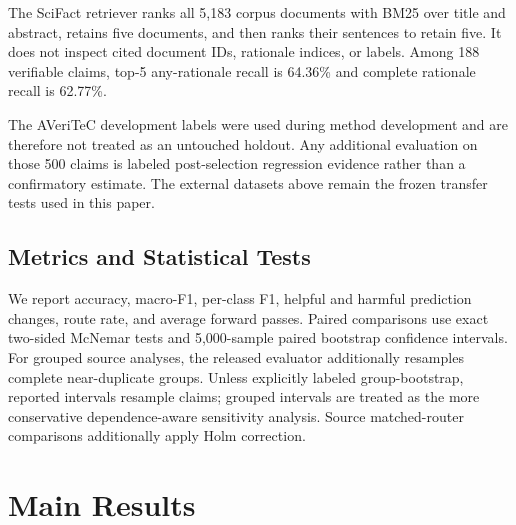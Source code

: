 \documentclass[runningheads]{llncs}
\begin{document}
The SciFact retriever ranks all 5,183 corpus documents with BM25 over title and
abstract, retains five documents, and then ranks their sentences to retain
five. It does not inspect cited document IDs, rationale indices, or labels.
Among 188 verifiable claims, top-5 any-rationale recall is 64.36\% and complete
rationale recall is 62.77\%.

The AVeriTeC development labels were used during method development and are
therefore not treated as an untouched holdout. Any additional evaluation on
those 500 claims is labeled post-selection regression evidence rather than a
confirmatory estimate. The external datasets above remain the frozen transfer
tests used in this paper.

\subsection{Metrics and Statistical Tests}

We report accuracy, macro-F1, per-class F1, helpful and harmful prediction
changes, route rate, and average forward passes. Paired comparisons use exact
two-sided McNemar tests and 5,000-sample paired bootstrap confidence intervals.
For grouped source analyses, the released evaluator additionally resamples
complete near-duplicate groups. Unless explicitly labeled group-bootstrap,
reported intervals resample claims; grouped intervals are treated as the more
conservative dependence-aware sensitivity analysis. Source matched-router
comparisons additionally apply Holm correction.

\section{Main Results}
\end{document}
